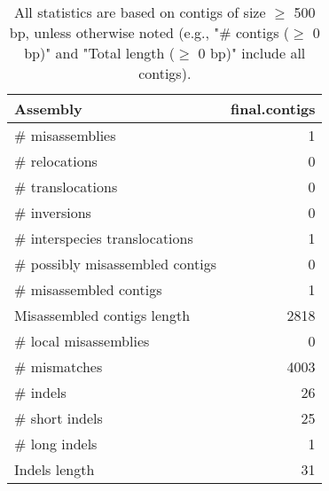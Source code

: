 \documentclass[12pt,a4paper]{article}
\begin{document}
\begin{table}[ht]
\begin{center}
\caption{All statistics are based on contigs of size $\geq$ 500 bp, unless otherwise noted (e.g., "\# contigs ($\geq$ 0 bp)" and "Total length ($\geq$ 0 bp)" include all contigs).}
\begin{tabular}{|l*{1}{|r}|}
\hline
Assembly & final.contigs \\ \hline
\# misassemblies & 1 \\ \hline
\hspace{5mm}\# relocations & 0 \\ \hline
\hspace{5mm}\# translocations & 0 \\ \hline
\hspace{5mm}\# inversions & 0 \\ \hline
\hspace{5mm}\# interspecies translocations & 1 \\ \hline
\# possibly misassembled contigs & 0 \\ \hline
\# misassembled contigs & 1 \\ \hline
Misassembled contigs length & 2818 \\ \hline
\# local misassemblies & 0 \\ \hline
\# mismatches & 4003 \\ \hline
\# indels & 26 \\ \hline
\hspace{5mm}\# short indels & 25 \\ \hline
\hspace{5mm}\# long indels & 1 \\ \hline
Indels length & 31 \\ \hline
\end{tabular}
\end{center}
\end{table}
\end{document}
